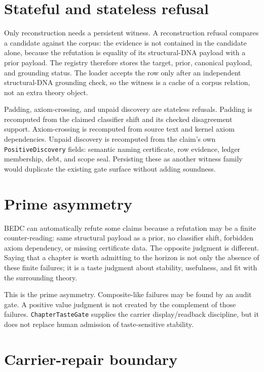 \section{Stateful and stateless refusal}
\label{sec:pseudotheory-refutation-stateful-stateless}

Only reconstruction needs a persistent witness.  A reconstruction refusal
compares a candidate against the corpus: the evidence is not contained in the
candidate alone, because the refutation is equality of its structural-DNA
payload with a prior payload.  The registry therefore stores the target, prior,
canonical payload, and grounding status.  The loader accepts the row only after
an independent structural-DNA grounding check, so the witness is a cache of a
corpus relation, not an extra theory object.

Padding, axiom-crossing, and unpaid discovery are stateless refusals.  Padding
is recomputed from the claimed classifier shift and its checked disagreement
support.  Axiom-crossing is recomputed from source text and kernel axiom
dependencies.  Unpaid discovery is recomputed from the claim's own
\texttt{PositiveDiscovery} fields: semantic naming certificate, row evidence,
ledger membership, debt, and scope seal.  Persisting these as another witness
family would duplicate the existing gate surface without adding soundness.

\section{Prime asymmetry}
\label{sec:pseudotheory-refutation-prime-asymmetry}

BEDC can automatically refute some claims because a refutation may be a finite
counter-reading: same structural payload as a prior, no classifier shift,
forbidden axiom dependency, or missing certificate data.  The opposite judgment
is different.  Saying that a chapter is worth admitting to the horizon is not
only the absence of these finite failures; it is a taste judgment about
stability, usefulness, and fit with the surrounding theory.

This is the prime asymmetry.  Composite-like failures may be found by an audit
gate.  A positive value judgment is not created by the complement of those
failures.  \texttt{ChapterTasteGate} supplies the carrier display/readback
discipline, but it does not replace human admission of taste-sensitive
stability.

\section{Carrier-repair boundary}
\label{sec:pseudotheory-refutation-carrier-repair-boundary}

